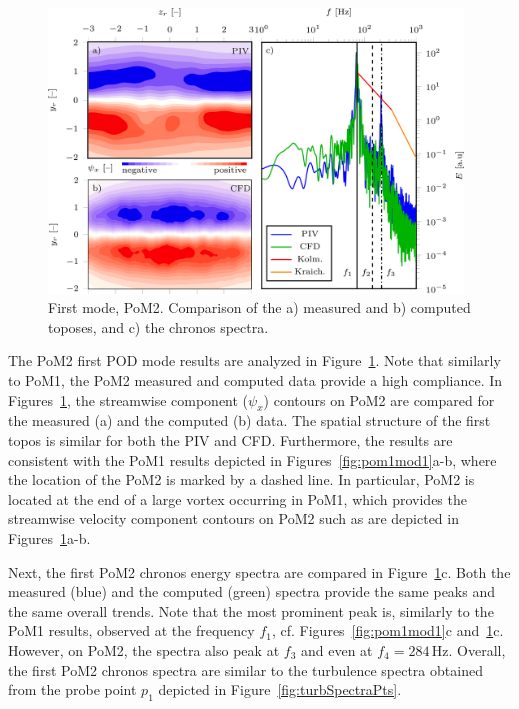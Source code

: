 \begin{figure}[htpb]
    \centering
    \includegraphics[width=0.98\textwidth]{02_images/00_export/figure12.png}
    \caption{{First mode, PoM2.} Comparison of the a) measured and b) computed toposes, and c) the chronos spectra.}
    \label{fig:pom2mod1}
\end{figure}
The PoM2 first POD mode results are analyzed in Figure~\ref{fig:pom2mod1}. Note that {similarly to PoM1,} the PoM2 measured and computed data provide {a} high compliance. In Figures~\ref{fig:pom2mod1}, the streamwise  component ($\psi_x$) contours on PoM2 are compared for the measured (a) and the computed (b) data. The spatial structure of the first topos is similar for both {the} PIV and CFD. Furthermore, the results are consistent with the PoM1 results depicted in Figures~\ref{fig:pom1mod1}a-b, where the location of the PoM2 is marked by {a} dashed line. In particular, PoM2 is located at the end of {a} large vortex occurring in PoM1, which provides the streamwise velocity component contours on PoM2 such as are depicted in Figures~\ref{fig:pom2mod1}a-b.

Next, the first PoM2 chronos energy spectra are compared in Figure~\ref{fig:pom2mod1}c. Both {the} measured {(blue)} and the computed {(green)} spectra provide the same peaks {and the same overall trends}. Note that the {most prominent} peak is, similarly {to} {the} PoM1 {results,} observed at {the} frequency $f_1$, {cf. Figures~\ref{fig:pom1mod1}c and~\ref{fig:pom2mod1}c}. However, on PoM2{, the} spectra also peak at $f_3$ and {even at} $f_4=284\,$Hz. Overall, the first PoM2 chronos spectra are similar to the turbulence spectra {obtained from the probe point $p_{1}$} depicted in Figure~\ref{fig:turbSpectraPts}. 

